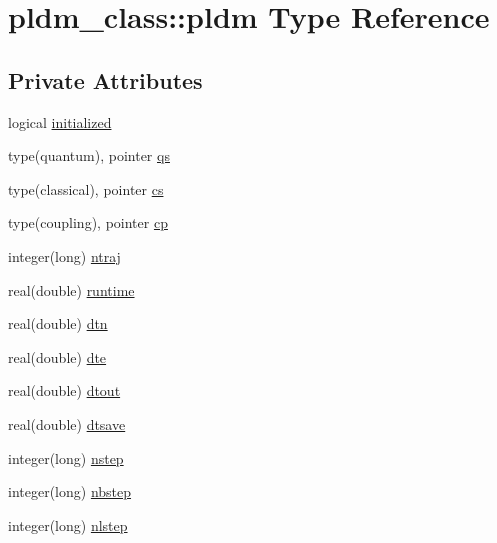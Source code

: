 \hypertarget{structpldm__class_1_1pldm}{\section{pldm\+\_\+class\+:\+:pldm Type Reference}
\label{structpldm__class_1_1pldm}
}
\subsection*{Private Attributes}
\begin{DoxyCompactItemize}
\item 
logical \hyperlink{structpldm__class_1_1pldm_a1f68ee324c28b824df1acf99db3d7a6f}{initialized}
\item 
type(quantum), pointer \hyperlink{structpldm__class_1_1pldm_a928fc31d7c422b903cf8be2c66ecc8ab}{qs}
\item 
type(classical), pointer \hyperlink{structpldm__class_1_1pldm_a2366c673bb4049d423c1605f801c49ab}{cs}
\item 
type(coupling), pointer \hyperlink{structpldm__class_1_1pldm_a029ca44825538a8806a9383f1b04914e}{cp}
\item 
integer(long) \hyperlink{structpldm__class_1_1pldm_aab5aaef447d621035a2492d5c64aa965}{ntraj}
\item 
real(double) \hyperlink{structpldm__class_1_1pldm_a6792078530b667f6e179e339ad3f705b}{runtime}
\item 
real(double) \hyperlink{structpldm__class_1_1pldm_a03a577c0a1845e2f6b01ab5aacb9bd0f}{dtn}
\item 
real(double) \hyperlink{structpldm__class_1_1pldm_a59460330dd0feba03a287ac14711d9a8}{dte}
\item 
real(double) \hyperlink{structpldm__class_1_1pldm_a0eb418c77739ccce504fb1b253fb81ba}{dtout}
\item 
real(double) \hyperlink{structpldm__class_1_1pldm_a94c39a7e7249bd187ee05bf43e4f6949}{dtsave}
\item 
integer(long) \hyperlink{structpldm__class_1_1pldm_a4cf2258a15663bb09c8deaacc46f8feb}{nstep}
\item 
integer(long) \hyperlink{structpldm__class_1_1pldm_a7559842c3c853eff4da5c5c59b5ca456}{nbstep}
\item 
integer(long) \hyperlink{structpldm__class_1_1pldm_a0c305b91e7503b54c413d3e84e83814f}{nlstep}
\end{DoxyCompactItemize}


